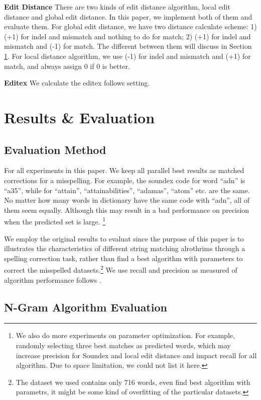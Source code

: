 \documentclass[11pt]{article}
\begin{document}
\noindent\textbf{Edit Distance} There are two kinds of edit distance algorithm, local edit distance and global edit distance. In this paper,  we implement both of them and evaluate them. For global edit distance, we have two distance calculate scheme: 1) (+1) for indel and mismatch and nothing to do for match; 2) (+1) for indel and mismatch and (-1) for match. The different between them will discuss in Section \ref{lab:res}. For local distance algorithm, we use (-1) for indel and mismatch and (+1) for match, and always assign 0 if 0 is better.

\noindent\textbf{Editex} We calculate the editex follows  \cite{Zobel1996PhoneticSM} setting.
 
\section{Results \& Evaluation}\label{lab:res}

\subsection{Evaluation Method}

For all experiments in this paper. We keep all parallel best results as matched corrections for a misspelling. For example, the soundex code for word ``adn'' is ``a35'', while for ``attain'', ``attainabilities'', ``adamas'', ``atom'' etc. are the same. No matter how many words in dictionary have the same code with ``adn'', all of them seem equally. Although this may result in a bad performance on precision when the predicted set is large. \footnote{We also do more experiments on parameter optimization. For example, randomly selecting three best matches as predicted words, which may increase precision for Soundex and local edit distance and impact recall for all algorithm. Due to space limitation, we could not list it here.}

We employ the original results to evaluat since the purpose of this paper is to illustrates the characteristics of different string matching alrothrims through a spelling correction task, rather than find a best algorithm with parameters to correct the misspelled datasets.\footnote{The dataset we used contains only 716 words, even find best algorithm with parametrs, it might be some kind of overfitting of the particular datasets.} We use recall and precision as measured of algorithm performance follows \cite{Raghavan1989}.

\subsection{N-Gram Algorithm Evaluation}
\end{document}
